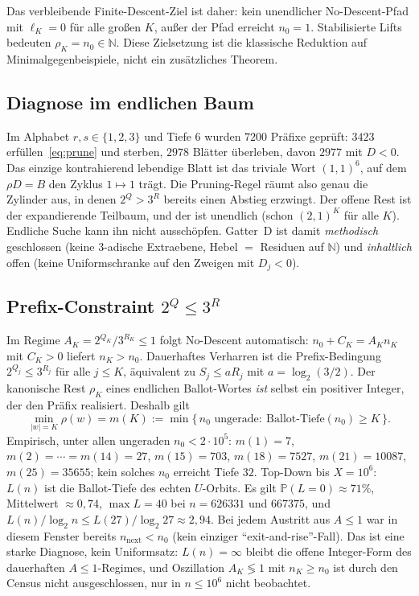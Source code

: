 \documentclass[11pt,reqno]{amsart}
\theoremstyle{definition}
\theoremstyle{remark}
\numberwithin{equation}{section}
\begin{document}
Das verbleibende Finite-Descent-Ziel ist daher:
kein unendlicher No-Descent-Pfad mit $\ell_K=0$ für alle großen $K$,
außer der Pfad erreicht $n_0=1$.
Stabilisierte Lifts bedeuten $\rho_K=n_0\in\mathbb{N}$.
Diese Zielsetzung ist die klassische Reduktion auf Minimalgegenbeispiele, nicht ein zusätzliches Theorem.

\subsection{Diagnose im endlichen Baum}

Im Alphabet $r,s\in\{1,2,3\}$ und Tiefe $6$ wurden $7200$ Präfixe geprüft:
$3423$ erfüllen~\eqref{eq:prune} und sterben,
$2978$ Blätter überleben,
davon $2977$ mit $D<0$.
Das einzige kontrahierend lebendige Blatt ist das triviale Wort $(1,1)^6$, auf dem $\rho D=B$ den Zyklus $1\mapsto 1$ trägt.
Die Pruning-Regel räumt also genau die Zylinder aus, in denen $2^{Q}>3^{R}$ bereits einen Abstieg erzwingt.
Der offene Rest ist der expandierende Teilbaum, und der ist unendlich (schon $(2,1)^{K}$ für alle $K$).
Endliche Suche kann ihn nicht ausschöpfen.
Gatter~D ist damit \emph{methodisch} geschlossen (keine $3$-adische Extraebene, Hebel $=$ Residuen auf $\mathbb{N}$) und \emph{inhaltlich} offen (keine Uniformschranke auf den Zweigen mit $D_j<0$).

\subsection{Prefix-Constraint $2^{Q}\le 3^{R}$}

Im Regime $A_K=2^{Q_K}/3^{R_K}\le 1$ folgt No-Descent automatisch:
$n_0+C_K=A_K n_K$ mit $C_K>0$ liefert $n_K>n_0$.
Dauerhaftes Verharren ist die Prefix-Bedingung $2^{Q_j}\le 3^{R_j}$ für alle $j\le K$,
äquivalent zu $S_j\le a R_j$ mit $a=\log_2(3/2)$.
Der kanonische Rest $\rho_K$ eines endlichen Ballot-Wortes \emph{ist} selbst ein positiver Integer, der den Präfix realisiert.
Deshalb gilt
\begin{equation}
\min_{|w|=K}\rho(w)
= m(K)
:= \min\{\,n_0\text{ ungerade}:\ \text{Ballot-Tiefe}(n_0)\ge K\,\}.
\end{equation}
Empirisch, unter allen ungeraden $n_0<2\cdot 10^5$:
$m(1)=7$, $m(2)=\cdots=m(14)=27$, $m(15)=703$, $m(18)=7527$, $m(21)=10087$, $m(25)=35655$;
kein solches $n_0$ erreicht Tiefe $32$.
Top-Down bis $X=10^6$: $L(n)$ ist die Ballot-Tiefe des echten $U$-Orbits.
Es gilt $\mathbb{P}(L=0)\approx 71\%$, Mittelwert $\approx 0{,}74$,
$\max L=40$ bei $n=626331$ und $667375$,
und $L(n)/\log_2 n \le L(27)/\log_2 27 \approx 2{,}94$.
Bei jedem Austritt aus $A\le 1$ war in diesem Fenster bereits $n_{\mathrm{next}}<n_0$
(kein einziger ``exit-and-rise''-Fall).
Das ist eine starke Diagnose, kein Uniformsatz: $L(n)=\infty$ bleibt die offene
Integer-Form des dauerhaften $A\le 1$-Regimes, und Oszillation $A_K\lessgtr 1$
mit $n_K\ge n_0$ ist durch den Census nicht ausgeschlossen, nur in $n\le 10^6$
nicht beobachtet.
\end{document}
